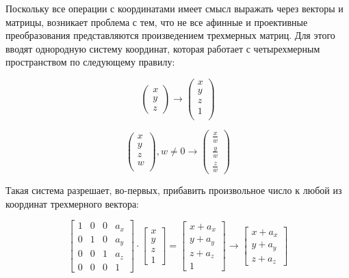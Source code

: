 \documentclass{article}
\begin{document}

Поскольку все операции с координатами имеет смысл выражать через векторы и матрицы, возникает проблема с тем, что не все афинные и проективные преобразования представляются произведением трехмерных матриц. Для этого вводят однородную систему координат, которая работает с четырехмерным пространством по следующему правилу:

$$\begin{pmatrix} x \\ y \\ z \end{pmatrix} \to \begin{pmatrix}x \\ y \\ z \\ 1\\ \end{pmatrix}$$

$$\begin{pmatrix}x \\ y \\ z \\ w\\ \end{pmatrix}, w \neq 0 \to \begin{pmatrix} \frac{x}{w} \\ \frac{y}{w} \\ \frac{z}{w}\end{pmatrix}$$

Такая система разрешает, во-первых, прибавить произвольное число к любой из координат трехмерного вектора:

$$\begin{bmatrix} 1 & 0 & 0 & a_x \\ 0 & 1 & 0 & a_y \\ 0 & 0 & 1 & a_z \\ 0 & 0 & 0 & 1\end{bmatrix} \cdot\begin{bmatrix} x \\ y \\ z \\ 1 \end{bmatrix} = \begin{bmatrix} x + a_x \\ y + a_y \\ z + a_z \\ 1 \end{bmatrix} \to \begin{bmatrix} x + a_x \\ y + a_y \\ z + a_z \end{bmatrix}$$
\end{document}
